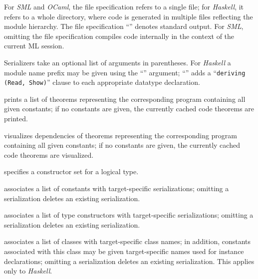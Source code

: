 \begin{isabellebody}
\begin{isamarkuptext}
\begin{descr}
  For \emph{SML} and \emph{OCaml}, the file specification refers to a
  single file; for \emph{Haskell}, it refers to a whole directory,
  where code is generated in multiple files reflecting the module
  hierarchy.  The file specification ``\isa{{\isachardoublequote}{\isacharminus}{\isachardoublequote}}'' denotes standard
  output.  For \emph{SML}, omitting the file specification compiles
  code internally in the context of the current ML session.

  Serializers take an optional list of arguments in parentheses.  For
  \emph{Haskell} a module name prefix may be given using the ``'' argument; ``'' adds a ``\verb|deriving (Read, Show)|'' clause to each appropriate datatype
  declaration.

  \item [\hyperlink{command.HOL.code-thms}{\mbox{\isa{\isacommand{code{\isacharunderscore}thms}}}}] prints a list of theorems
  representing the corresponding program containing all given
  constants; if no constants are given, the currently cached code
  theorems are printed.

  \item [\hyperlink{command.HOL.code-deps}{\mbox{\isa{\isacommand{code{\isacharunderscore}deps}}}}] visualizes dependencies of
  theorems representing the corresponding program containing all given
  constants; if no constants are given, the currently cached code
  theorems are visualized.

  \item [\hyperlink{command.HOL.code-datatype}{\mbox{\isa{\isacommand{code{\isacharunderscore}datatype}}}}] specifies a constructor set
  for a logical type.

  \item [\hyperlink{command.HOL.code-const}{\mbox{\isa{\isacommand{code{\isacharunderscore}const}}}}] associates a list of constants
  with target-specific serializations; omitting a serialization
  deletes an existing serialization.

  \item [\hyperlink{command.HOL.code-type}{\mbox{\isa{\isacommand{code{\isacharunderscore}type}}}}] associates a list of type
  constructors with target-specific serializations; omitting a
  serialization deletes an existing serialization.

  \item [\hyperlink{command.HOL.code-class}{\mbox{\isa{\isacommand{code{\isacharunderscore}class}}}}] associates a list of classes
  with target-specific class names; in addition, constants associated
  with this class may be given target-specific names used for instance
  declarations; omitting a serialization deletes an existing
  serialization.  This applies only to \emph{Haskell}.


\end{descr}
\end{isamarkuptext}
\end{isabellebody}
